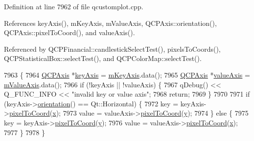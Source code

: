 Definition at line 7962 of file qcustomplot.\+cpp.



References key\+Axis(), m\+Key\+Axis, m\+Value\+Axis, Q\+C\+P\+Axis\+::orientation(), Q\+C\+P\+Axis\+::pixel\+To\+Coord(), and value\+Axis().



Referenced by Q\+C\+P\+Financial\+::candlestick\+Select\+Test(), pixels\+To\+Coords(), Q\+C\+P\+Statistical\+Box\+::select\+Test(), and Q\+C\+P\+Color\+Map\+::select\+Test().


\begin{DoxyCode}
7963                                                                \{
7964   \hyperlink{class_q_c_p_axis}{QCPAxis} *\hyperlink{class_q_c_p_abstract_plottable_a72c7a09c22963f2c943f07112b311103}{keyAxis} = \hyperlink{class_q_c_p_abstract_plottable_a426f42e254d0f8ce5436a868c61a6827}{mKeyAxis}.data();
7965   \hyperlink{class_q_c_p_axis}{QCPAxis} *\hyperlink{class_q_c_p_abstract_plottable_a3106f9d34d330a6097a8ec5905e5b519}{valueAxis} = \hyperlink{class_q_c_p_abstract_plottable_a2901452ca4aea911a1827717934a4bda}{mValueAxis}.data();
7966   \textcolor{keywordflow}{if} (!keyAxis || !valueAxis) \{
7967     qDebug() << Q\_FUNC\_INFO << \textcolor{stringliteral}{"invalid key or value axis"};
7968     \textcolor{keywordflow}{return};
7969   \}
7970 
7971   \textcolor{keywordflow}{if} (keyAxis->\hyperlink{class_q_c_p_axis_a57483f2f60145ddc9e63f3af53959265}{orientation}() == Qt::Horizontal) \{
7972     key = keyAxis->\hyperlink{class_q_c_p_axis_ae9289ef7043b9d966af88eaa95b037d1}{pixelToCoord}(\hyperlink{_comparision_pictures_2_createtest_image_8m_a9336ebf25087d91c818ee6e9ec29f8c1}{x});
7973     value = valueAxis->\hyperlink{class_q_c_p_axis_ae9289ef7043b9d966af88eaa95b037d1}{pixelToCoord}(\hyperlink{_comparision_pictures_2_createtest_image_8m_a2fb1c5cf58867b5bbc9a1b145a86f3a0}{y});
7974   \} \textcolor{keywordflow}{else} \{
7975     key = keyAxis->\hyperlink{class_q_c_p_axis_ae9289ef7043b9d966af88eaa95b037d1}{pixelToCoord}(\hyperlink{_comparision_pictures_2_createtest_image_8m_a2fb1c5cf58867b5bbc9a1b145a86f3a0}{y});
7976     value = valueAxis->\hyperlink{class_q_c_p_axis_ae9289ef7043b9d966af88eaa95b037d1}{pixelToCoord}(\hyperlink{_comparision_pictures_2_createtest_image_8m_a9336ebf25087d91c818ee6e9ec29f8c1}{x});
7977   \}
7978 \}
\end{DoxyCode}


